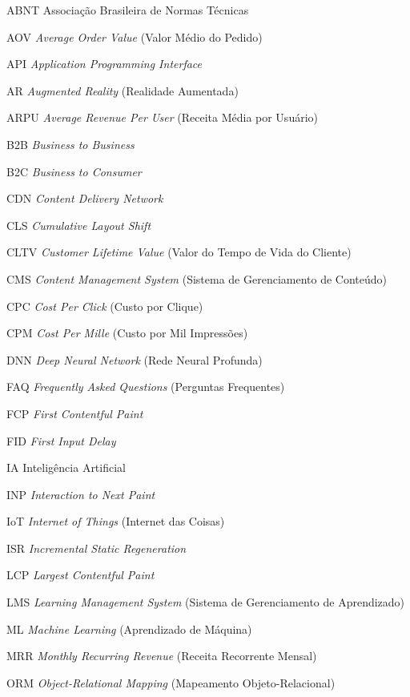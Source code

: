 \documentclass[
	12pt,				%
	twoside,			%
	a4paper,			%
	english,			%
	french,				%
	spanish,			%
	brazil				%
	]{abntex2}
\begin{document}
\begin{siglas}
  \item[ABNT] Associação Brasileira de Normas Técnicas
  \item[AOV] \textit{Average Order Value} (Valor Médio do Pedido)
  \item[API] \textit{Application Programming Interface}
  \item[AR] \textit{Augmented Reality} (Realidade Aumentada)
  \item[ARPU] \textit{Average Revenue Per User} (Receita Média por Usuário)
  \item[B2B] \textit{Business to Business}
  \item[B2C] \textit{Business to Consumer}
  \item[CDN] \textit{Content Delivery Network}
  \item[CLS] \textit{Cumulative Layout Shift}
  \item[CLTV] \textit{Customer Lifetime Value} (Valor do Tempo de Vida do Cliente)
  \item[CMS] \textit{Content Management System} (Sistema de Gerenciamento de Conteúdo)
  \item[CPC] \textit{Cost Per Click} (Custo por Clique)
  \item[CPM] \textit{Cost Per Mille} (Custo por Mil Impressões)
  \item[DNN] \textit{Deep Neural Network} (Rede Neural Profunda)
  \item[FAQ] \textit{Frequently Asked Questions} (Perguntas Frequentes)
  \item[FCP] \textit{First Contentful Paint}
  \item[FID] \textit{First Input Delay}
  \item[IA] Inteligência Artificial
  \item[INP] \textit{Interaction to Next Paint}
  \item[IoT] \textit{Internet of Things} (Internet das Coisas)
  \item[ISR] \textit{Incremental Static Regeneration}
  \item[LCP] \textit{Largest Contentful Paint}
  \item[LMS] \textit{Learning Management System} (Sistema de Gerenciamento de Aprendizado)
  \item[ML] \textit{Machine Learning} (Aprendizado de Máquina)
  \item[MRR] \textit{Monthly Recurring Revenue} (Receita Recorrente Mensal)
  \item[ORM] \textit{Object-Relational Mapping} (Mapeamento Objeto-Relacional)

\end{siglas}
\end{document}
